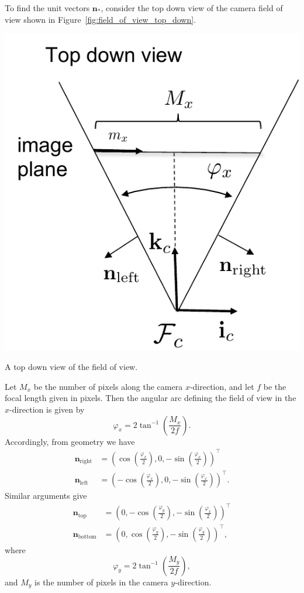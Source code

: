 To find the unit vectors $\mathbf{n}_{\ast}$, consider the top down view of the camera field of view shown in Figure~\ref{fig:field_of_view_top_down}.  
\begin{marginfigure}
  \includegraphics[width=\linewidth]{chap6_camera_features/figures/fov_calc}
  \caption{A top down view of the field of view.}
  \label{fig:fov_calc}
\end{marginfigure}
Let $M_x$ be the number of pixels along the camera $x$-direction, and let $f$ be the focal length given in pixels.  Then the angular arc defining the field of view in the $x$-direction is given by
\[
\varphi_x = 2\tan^{-1}\left(\frac{M_x}{2f}\right).
\]
Accordingly, from geometry we have 
\begin{align*}
\mathbf{n}_{\text{right}} &= \left(\cos\left(\frac{\varphi_x}{2}\right), 0, -\sin\left(\frac{\varphi_x}{2}\right) \right)^\top \\
\mathbf{n}_{\text{left}} &= \left(-\cos\left(\frac{\varphi_x}{2}\right), 0, -\sin\left(\frac{\varphi_x}{2}\right) \right)^\top.
\end{align*}
Similar arguments give
\begin{align*}
\mathbf{n}_{\text{top}} &= \left(0, -\cos\left(\frac{\varphi_y}{2}\right), -\sin\left(\frac{\varphi_x}{2}\right) \right)^\top \\
\mathbf{n}_{\text{bottom}} &= \left(0, \cos\left(\frac{\varphi_y}{2}\right), -\sin\left(\frac{\varphi_y}{2}\right) \right)^\top,
\end{align*}
where
\[
\varphi_y = 2\tan^{-1}\left(\frac{M_y}{2f}\right),
\]
and $M_y$ is the number of pixels in the camera $y$-direction.

